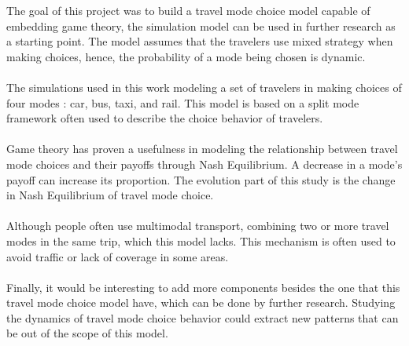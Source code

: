 The goal of this project was to build a travel mode choice model capable of embedding game theory, the simulation model can be used in further research as a starting point. The model assumes that the travelers use mixed strategy when making choices, hence, the probability of a mode being chosen is dynamic. 
\paragraph{}
The simulations used in this work modeling a set of travelers in making choices of four modes : car, bus, taxi, and rail. This model is based on a split mode framework often used to describe the choice behavior of travelers.
\paragraph{}
Game theory has proven a usefulness in modeling the relationship between travel mode choices and their payoffs through Nash Equilibrium. A decrease in a mode's payoff can increase its proportion. The evolution part of this study is the change in Nash Equilibrium of travel mode choice.
\paragraph{}
Although people often use multimodal transport, combining two or more travel modes in the same trip, which this model lacks. This mechanism is often used to avoid traffic or lack of coverage in some areas.
\paragraph{}Finally, it would be interesting to add more components besides the one that this travel mode choice model have, which can be done by further research. Studying the dynamics of travel mode choice behavior could extract new patterns that can be out of the scope of this model.